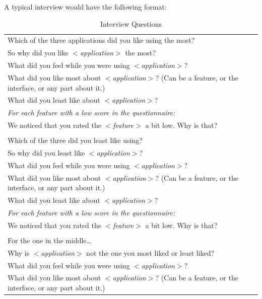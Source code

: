 		A typical interview would have the following format:
		\begin{longtable}{|p{13cm}|}
			\caption{Interview Questions} \label{tab:interview-questions} \\ 
		  	\hline
		  	Which of the three applications did you like using the most? \\ 
		  	So why did you like \textit{$<$application$>$} the most? \\ 
		  	What did you feel while you were using \textit{$<$application$>$}? \\ 
		  	What did you like most about \textit{$<$application$>$}? (Can be a feature, or the interface, or any part about it.) \\ 
		  	What did you least like about \textit{$<$application$>$}? \\ 
		  	\textit{For each feature with a low score in the questionnaire:} \\ 
		  	\hspace{6mm}We noticed that you rated the \textit{$<$feature$>$} a bit low. Why is that? \\ 
		  	\\
		  	Which of the three did you least like using? \\ 
		  	So why did you least like \textit{$<$application$>$}? \\ 
		  	What did you feel while you were using \textit{$<$application$>$}? \\ 
		  	What did you like most about \textit{$<$application$>$}? (Can be a feature, or the interface, or any part about it.) \\ 
		  	What did you least like about \textit{$<$application$>$}? \\ 
		  	\textit{For each feature with a low score in the questionnaire:} \\ 
		  	\hspace{6mm}We noticed that you rated the \textit{$<$feature$>$} a bit low. Why is that? \\ 
		  	\\
		  	For the one in the middle\ldots \\ 
		  	Why is \textit{$<$application$>$} not the one you most liked or least liked? \\
		  	What did you feel while you were using \textit{$<$application$>$}? \\ 
		  	What did you like most about \textit{$<$application$>$}? (Can be a feature, or the interface, or any part about it.) \\ 

\end{longtable}
